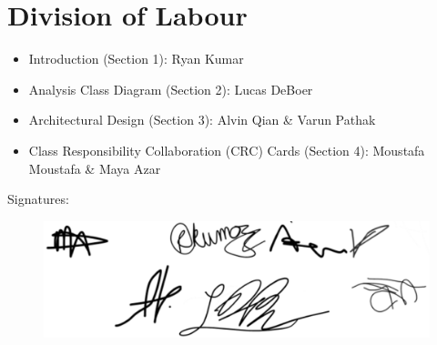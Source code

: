 \documentclass[]{article}
\begin{document}
\appendix
\section{Division of Labour}
\label{sec:division_of_labour}

\begin{itemize}
    \item Introduction (Section 1): Ryan Kumar
    \item Analysis Class Diagram (Section 2): Lucas DeBoer 
    \item Architectural Design (Section 3): Alvin Qian \& Varun Pathak
    \item Class Responsibility Collaboration (CRC) Cards (Section 4): Moustafa Moustafa \& Maya Azar
\end{itemize}

Signatures:
\begin{figure}[H]
	\centering
	\includegraphics[width = \textwidth]{Signatures.png}
\end{figure}
\end{document}
